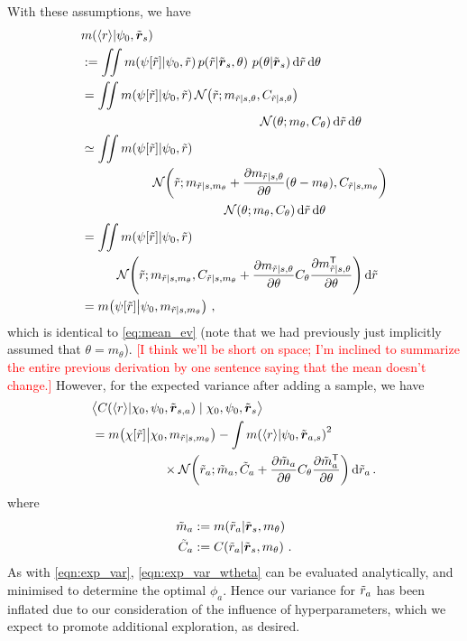 \documentclass{article}
\begin{document}
With these assumptions, we have
\begin{align*}
& \mean{\inty{r}}{\psi_0,\tvr_s} \\
& \deq \iint \mean{\psi[\tr]}{\psi_0,\tr}
\p{\tr}{\tvr_s, \theta}\, \p{\theta}{\tvr_s}\ud \tr\,\ud \theta\\
& = \iint \mean{\psi[\tr]}{\psi_0,\tr} \N{\tr}{m_{\tr|s,\theta}}{C_{\tr|s,\theta}}
\\
& \hspace{5cm}\N{\theta}{m_\theta}{C_\theta}\ud \tr\,\ud \theta
\\
& \simeq \iint \mean{\psi[\tr]}{\psi_0,\tr} 
\\
& \hspace{2cm}\N{\tr}
{m_{\tr|s,m_\theta}+\pderiv{m_{\tr|s,\theta}}{\theta}(\theta-m_\theta)}
{C_{\tr|s,m_\theta}}
\\
& \hspace{4cm}
\N{\theta}{m_\theta}{C_\theta}\ud \tr\,\ud \theta
\\
& = \iint \mean{\psi[\tr]}{\psi_0,\tr} \\
& \hspace{1cm}\N{\tr}
{m_{\tr|s,m_\theta}}
{C_{\tr|s,m_\theta}+\pderiv{m_{\tr|s,\theta}}{\theta}C_\theta\pderiv{m\tra_{\tr|s,\theta}}{\theta}}
\ud \tr
\\
& = \mean{\psi[\tr]}{\psi_0,m_{\tr|s,m_\theta}}\,,
\end{align*}
which is identical to \eqref{eq:mean_ev} (note that we had previously just implicitly assumed that $\theta=m_\theta$). 
\textcolor{red}{[I think we'll be short on space; I'm inclined to summarize the entire previous derivation by one sentence saying that the mean doesn't change.]}
However, for the expected variance after adding a sample, we have
\begin{align}\label{eqn:exp_var_wtheta}
& \bigl\langle \cov{\langle r\rangle}{\chi_0,\psi_0,\tvr_{s,a}}\mid \chi_0,\psi_0,\tvr_{s}\bigr\rangle
\nonumber\\
& =  \mean{\chi[\tr]}{\chi_0,m_{\tr|s,m_\theta}}  - 
\int\mean{\inty{r}}{\psi_0,\tvr_{a,s}}^2
\nonumber\\
& \hspace{2cm}
\times\N{\tr_a}
{\tilde{m}_a }
{\tilde{C}_a +\pderiv{\tilde{m}_a}{\theta}C_\theta\pderiv{\tilde{m}\tra_a}{\theta}}
\ud\tr_a\,.
\end{align}
where
\begin{align*}
\tilde{m}_a & \deq \mean{\tr_a}{\tvr_s,m_\theta}\\
\tilde{C}_a & \deq \cov{\tr_a}{\tvr_s,m_\theta}\,.
\end{align*}
As with \eqref{eqn:exp_var}, \eqref{eqn:exp_var_wtheta} can be evaluated analytically, and minimised to determine the optimal $\phi_a$.
Hence our variance for $\tr_a$ has been inflated due to our consideration of the influence of hyperparameters, which we expect to promote additional exploration, as desired.




\end{document}
